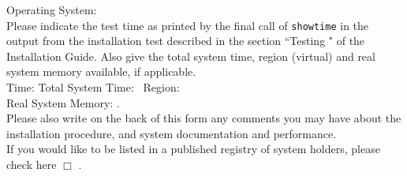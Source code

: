 Operating System: \hrulefill \\
Please indicate the test time as printed by the final call of {\tt showtime}
in the output from the installation test described in the
section ``Testing {\REDUCE}" of the {\REDUCE} Installation Guide.  Also
give the total system time, region (virtual) and real system memory
available, if applicable. \vspace*{4mm}
\\
Time: \hrulefill Total System Time: \hrulefill\   Region: \hrulefill \vspace*{4mm}
\\
Real System Memory: \hrulefill  .\hspace*{5cm}
\vspace*{3 mm} \\
Please also write on the back of this form any comments you may have about
the installation procedure, and system documentation and performance.
\\[3mm]
\noindent
If you would like to be listed in a published registry of {\REDUCE} system
holders, please check here $\Box$ .


